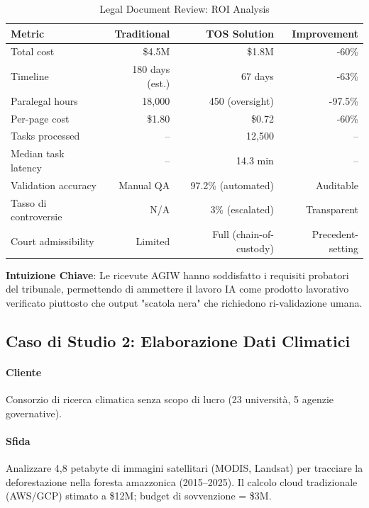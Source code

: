 \documentclass[11pt]{article}
\begin{document}
\begin{itemize}[noitemsep]
\begin{table}[H]
\centering
\caption{Legal Document Review: ROI Analysis}
\label{tab:legal-roi}
\begin{tabular}{@{}lrrr@{}}
\toprule
\textbf{Metric} & \textbf{Traditional} & \textbf{TOS Solution} & \textbf{Improvement} \\ \midrule
Total cost & \$4.5M & \$1.8M & -60\% \\
Timeline & 180 days (est.) & 67 days & -63\% \\
Paralegal hours & 18,000 & 450 (oversight) & -97.5\% \\
Per-page cost & \$1.80 & \$0.72 & -60\% \\
Tasks processed & -- & 12,500 & -- \\
Median task latency & -- & 14.3 min & -- \\
Validation accuracy & Manual QA & 97.2\% (automated) & Auditable \\
Tasso di controversie & N/A & 3\% (escalated) & Transparent \\
Court admissibility & Limited & Full (chain-of-custody) & Precedent-setting \\
\bottomrule
\end{tabular}
\end{table}

\textbf{Intuizione Chiave}: Le ricevute AGIW hanno soddisfatto i requisiti probatori del tribunale, permettendo di ammettere il lavoro IA come prodotto lavorativo verificato piuttosto che output "scatola nera" che richiedono ri-validazione umana.

\subsection{Caso di Studio 2: Elaborazione Dati Climatici}

\paragraph{Cliente} Consorzio di ricerca climatica senza scopo di lucro (23 università, 5 agenzie governative).

\paragraph{Sfida} Analizzare 4,8 petabyte di immagini satellitari (MODIS, Landsat) per tracciare la deforestazione nella foresta amazzonica (2015--2025). Il calcolo cloud tradizionale (AWS/GCP) stimato a \$12M; budget di sovvenzione = \$3M.


\end{itemize}
\end{document}
